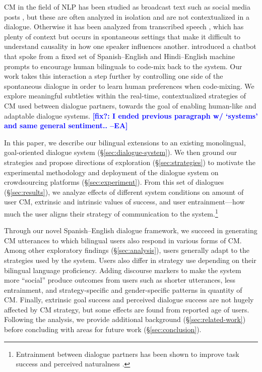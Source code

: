 \documentclass[11pt,a4paper]{article}
\newcommand{\ea}[1]{\textcolor{blue}{\bf\small [#1 --EA]}}
\newcommand{\Sref}[1]{\S\ref{#1}}
\begin{document}
CM in the field of NLP has been studied as broadcast text such as social media posts \citep{Molina2016,Rijhwani2017}, but these are often analyzed in isolation and are not contextualized in a dialogue. 
Otherwise it has been analyzed from transcribed speech \citep{lyu2010,LI2014,deuchar2014building}, which has plenty of context but occurs in spontaneous settings that make it difficult to understand causality in how one speaker influences another.
\citet{ramanarayanan2017jee} introduced a chatbot that spoke from a fixed set of Spanish--English and Hindi--English machine prompts to encourage human bilinguals to code-mix back to the system. 
Our work takes this interaction a step further by controlling one side of the spontaneous dialogue in order to learn human preferences when code-mixing.
We explore meaningful subtleties within the real-time, contextualized strategies of CM used between dialogue partners, towards the goal of enabling human-like and adaptable dialogue systems.
\ea{fix?: I ended previous paragraph w/ `systems' and same general sentiment..}

In this paper, we describe our bilingual extensions to an existing monolingual, goal-oriented dialogue system (\Sref{sec:dialogue-system}).
We then ground our strategies and propose directions of exploration (\Sref{sec:strategies}) to motivate the experimental methodology and deployment of the dialogue system on crowdsourcing platforms (\Sref{sec:experiment}). 
From this set of dialogues (\Sref{sec:results}), we analyze effects of different system conditions on amount of user CM, extrinsic and intrinsic values of success, and user entrainment---how much the user aligns their strategy of communication to the system.\footnote{Entrainment between dialogue partners has been shown to improve task success and perceived naturalness \citep{reitter2014alignment,Nenkova2008}.}

Through our novel Spanish--English dialogue framework, we succeed in generating CM utterances to which bilingual users also respond in various forms of CM.
Among other exploratory findings (\Sref{sec:analysis}), users generally adapt to the strategies used by the system.
Users also differ in strategy use depending on their bilingual language proficiency.
Adding discourse markers to make the system more ``social'' produce outcomes from users such as shorter utterances, less entrainment, and strategy-specific and gender-specific patterns in quantity of CM.
Finally, extrinsic goal success and perceived dialogue success are not hugely affected by CM strategy, but some effects are found from reported age of users.
Following the analysis, we provide additional background (\Sref{sec:related-work}) before concluding with areas for future work (\Sref{sec:conclusion}).
\end{document}
